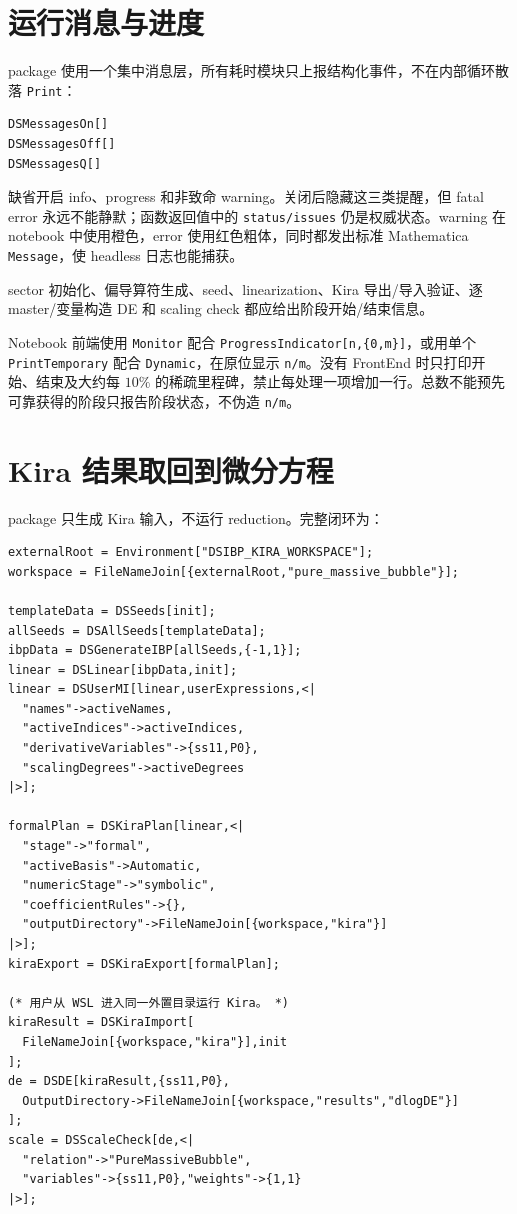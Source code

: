 ﻿\documentclass[a4paper,11pt]{article}
\begin{document}
\section{运行消息与进度}

package 使用一个集中消息层，所有耗时模块只上报结构化事件，不在内部循环散落 \texttt{Print}：
\begin{verbatim}
DSMessagesOn[]
DSMessagesOff[]
DSMessagesQ[]
\end{verbatim}
缺省开启 info、progress 和非致命 warning。关闭后隐藏这三类提醒，但 fatal error 永远不能静默；函数返回值中的 \texttt{status/issues} 仍是权威状态。warning 在 notebook 中使用橙色，error 使用红色粗体，同时都发出标准 Mathematica \texttt{Message}，使 headless 日志也能捕获。

sector 初始化、偏导算符生成、seed、linearization、Kira 导出/导入验证、逐 master/变量构造 DE 和 scaling check 都应给出阶段开始/结束信息。

Notebook 前端使用 \texttt{Monitor} 配合 \texttt{ProgressIndicator[n,\{0,m\}]}，或用单个 \texttt{PrintTemporary} 配合 \texttt{Dynamic}，在原位显示 \texttt{n/m}。没有 FrontEnd 时只打印开始、结束及大约每 $10\%$ 的稀疏里程碑，禁止每处理一项增加一行。总数不能预先可靠获得的阶段只报告阶段状态，不伪造 \texttt{n/m}。

\section{Kira 结果取回到微分方程}

package 只生成 Kira 输入，不运行 reduction。完整闭环为：
\begin{verbatim}
externalRoot = Environment["DSIBP_KIRA_WORKSPACE"];
workspace = FileNameJoin[{externalRoot,"pure_massive_bubble"}];

templateData = DSSeeds[init];
allSeeds = DSAllSeeds[templateData];
ibpData = DSGenerateIBP[allSeeds,{-1,1}];
linear = DSLinear[ibpData,init];
linear = DSUserMI[linear,userExpressions,<|
  "names"->activeNames,
  "activeIndices"->activeIndices,
  "derivativeVariables"->{ss11,P0},
  "scalingDegrees"->activeDegrees
|>];

formalPlan = DSKiraPlan[linear,<|
  "stage"->"formal",
  "activeBasis"->Automatic,
  "numericStage"->"symbolic",
  "coefficientRules"->{},
  "outputDirectory"->FileNameJoin[{workspace,"kira"}]
|>];
kiraExport = DSKiraExport[formalPlan];

(* 用户从 WSL 进入同一外置目录运行 Kira。 *)
kiraResult = DSKiraImport[
  FileNameJoin[{workspace,"kira"}],init
];
de = DSDE[kiraResult,{ss11,P0},
  OutputDirectory->FileNameJoin[{workspace,"results","dlogDE"}]
];
scale = DSScaleCheck[de,<|
  "relation"->"PureMassiveBubble",
  "variables"->{ss11,P0},"weights"->{1,1}
|>];
\end{verbatim}
\end{document}
